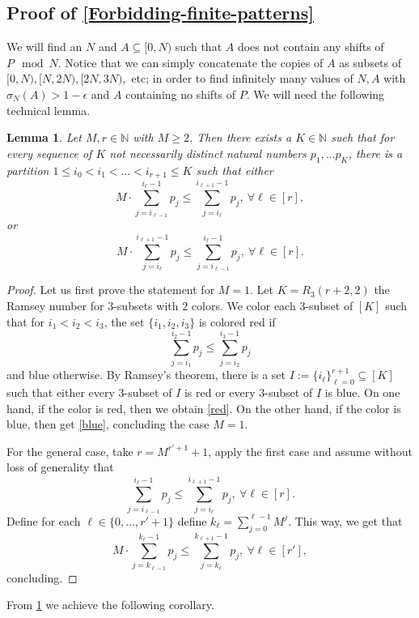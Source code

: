 \documentclass[letter, 11pt]{article}
\theoremstyle{plain} %
\newtheorem{lemma}[theorem]{Lemma}
\theoremstyle{definition} %
\theoremstyle{plain}
\theoremstyle{plain}
\newcommand{\N}{\mathbb{N}}
\newcommand{\1}{\mathbbm{1}}
\begin{document}
\subsection{Proof of \cref{Forbidding-finite-patterns}}
We will find an $N$ and $A \subseteq [0,N)$ such that $A$ does not contain any shifts of $P \mod N$. Notice that we can simply concatenate the copies of $A$ as subsets of $[0,N), [N, 2N), [2N, 3N),$ etc; in order to find infinitely many values of $N,A$ with $\sigma_N (A) > 1- \epsilon$ and $A$ containing no shifts of $P$. 
We will need the following technical lemma.

\begin{lemma}\label{partition}
    Let $M, r \in \N$ with $M \geq 2$. Then there exists a $K \in \N$ such that for every sequence of $K$ not necessarily distinct natural numbers $p_1, \ldots p_K$, there is a partition $1 \leq i_0   <i_1 < \ldots < i_{r+1} \leq K$ such that either
    \begin{equation}\label{red}
          M \cdot  \sum_{j =i_{\ell-1}}^{i_{\ell}-1} p_j \leq \sum_{j =i_{\ell}}^{i_{\ell+1}-1} p_j, \  \forall \ell\in [r], 
    \end{equation}
        or 
        \begin{equation}\label{blue}
             M  \cdot  \sum_{j =i_{\ell}}^{i_{\ell+1}-1}p_j \leq \sum_{j =i_{\ell-1}}^{i_{\ell}-1} p_j, \    \forall \ell\in [r].
        \end{equation}
\end{lemma}

\begin{proof}
Let us first prove the statement for $M=1$. Let $K= R_{3}(r+2,2)$ the Ramsey number for $3$-subsets with $2$ colors. We color each $3$-subset of $[K]$ such that for $i_1<i_2<i_3$, the set $\{i_1,i_2,i_3\}$ is colored red if 
$$\sum_{j=i_1}^{i_2-1}p_j \leq \sum_{j=i_2}^{i_3-1} p_j$$
and blue otherwise. By Ramsey's theorem, there is a set $I:=\{i_{\ell}\}_{\ell=0}^{r+1}\subseteq [K]$ such that either every $3$-subset of $I$ is red or every $3$-subset of $I$ is blue. On one hand, if the color is red, then we obtain \cref{red}. On the other hand, if the color is blue, then get \cref{blue}, concluding the case $M=1$.

For the general case, take $r=  M^{r'+1}+1$, apply the first case and assume without loss of generality that 
$$    \sum_{j =i_{\ell-1}}^{i_{\ell}-1} p_j \leq \sum_{j =i_{\ell}}^{i_{\ell+1}-1} p_j, \  \forall \ell\in [r].  $$
Define for each $\ell\in \{0,\ldots,r'+1\}$ define $k_{\ell}= \sum_{j=0}^{\ell-1}M^j$. This way, we get that 
$$       M \cdot  \sum_{j =k_{\ell-1}}^{k_{\ell}-1} p_j \leq \sum_{j =k_{\ell}}^{k_{\ell+1}-1} p_j, \  \forall \ell\in [r'],  $$
concluding.
\end{proof}
From \cref{partition} we achieve the following corollary.
\end{document}
